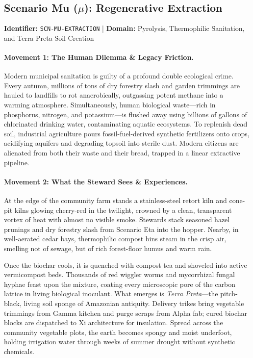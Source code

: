 \subsection{Scenario Mu (\texorpdfstring{$\mu$}{Mu}): Regenerative Extraction}
\label{subsec:scn_mu}
\textbf{Identifier:} \texttt{SCN-MU-EXTRACTION} \quad | \quad \textbf{Domain:} Pyrolysis, Thermophilic Sanitation, and Terra Preta Soil Creation

\paragraph{Movement 1: The Human Dilemma \& Legacy Friction.}
Modern municipal sanitation is guilty of a profound double ecological crime. Every autumn, millions of tons of dry forestry slash and garden trimmings are hauled to landfills to rot anaerobically, outgassing potent methane into a warming atmosphere. Simultaneously, human biological waste---rich in phosphorus, nitrogen, and potassium---is flushed away using billions of gallons of chlorinated drinking water, contaminating aquatic ecosystems. To replenish dead soil, industrial agriculture pours fossil-fuel-derived synthetic fertilizers onto crops, acidifying aquifers and degrading topsoil into sterile dust. Modern citizens are alienated from both their waste and their bread, trapped in a linear extractive pipeline.

\paragraph{Movement 2: What the Steward Sees \& Experiences.}
At the edge of the community farm stands a stainless-steel retort kiln and cone-pit kilns glowing cherry-red in the twilight, crowned by a clean, transparent vortex of heat with almost no visible smoke. Stewards stack seasoned hazel prunings and dry forestry slash from Scenario Eta into the hopper. Nearby, in well-aerated cedar bays, thermophilic compost bins steam in the crisp air, smelling not of sewage, but of rich forest-floor humus and warm rain. 

Once the biochar cools, it is quenched with compost tea and shoveled into active vermicompost beds. Thousands of red wiggler worms and mycorrhizal fungal hyphae feast upon the mixture, coating every microscopic pore of the carbon lattice in living biological inoculant. What emerges is \textit{Terra Preta}---the pitch-black, living soil sponge of Amazonian antiquity. Delivery trikes bring vegetable trimmings from Gamma kitchen and purge scraps from Alpha fab; cured biochar blocks are dispatched to Xi architecture for insulation. Spread across the community vegetable plots, the earth becomes spongy and moist underfoot, holding irrigation water through weeks of summer drought without synthetic chemicals.

